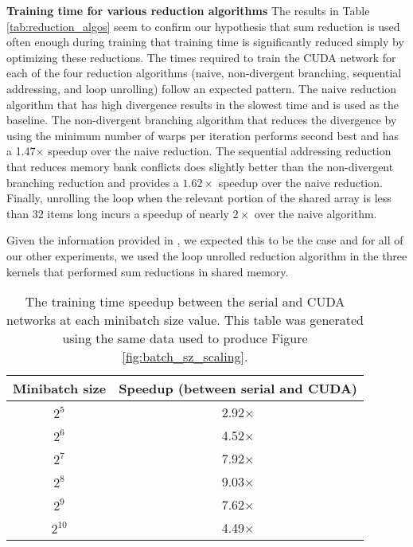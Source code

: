 \documentclass[11pt,a4paper]{article}
\begin{document}
\vspace{10pt}
\noindent \textbf{Training time for various reduction algorithms}
The results in Table \ref{tab:reduction_algos} seem to confirm our hypothesis that sum reduction is used often enough during training that training time is significantly reduced simply by optimizing these reductions. The times required to train the CUDA network for each of the four reduction algorithms (naive, non-divergent branching, sequential addressing, and loop unrolling) follow an expected pattern. The naive reduction algorithm that has high divergence results in the slowest time and is used as the baseline. The non-divergent branching algorithm that reduces the divergence by using the minimum number of warps per iteration performs second best and has a 1.47$\times$ speedup over the naive reduction. The sequential addressing reduction that reduces memory bank conflicts does slightly better than the non-divergent branching reduction and provides a $1.62\times$ speedup over the naive reduction. Finally, unrolling the loop when the relevant portion of the shared array is less than 32 items long incurs a speedup of nearly $2\times$ over the naive algorithm. 

Given the information provided in \cite{choi_reductions}, we expected this to be the case and for all of our other experiments, we used the loop unrolled reduction algorithm in the three kernels that performed sum reductions in shared memory.

\vspace{10pt}
\noindent 
\begin{table} 
\centering
\small
  \begin{tabular}{|c||c|}
    \hline
    Minibatch size & Speedup (between serial and CUDA)\\
    \hline
    \rule{0pt}{2.5ex}$2^5$ & 2.92$\times$\\ 
    \hline
    \rule{0pt}{2.5ex}$2^6$ & 4.52$\times$\\ 
    \hline
    \rule{0pt}{2.5ex}$2^7$ & 7.92$\times$\\ 
    \hline
    \rule{0pt}{2.5ex}$2^8$ & 9.03$\times$\\ 
    \hline
    \rule{0pt}{2.5ex}$2^9$ & 7.62$\times$\\ 
    \hline
    \rule{0pt}{2.5ex}$2^{10}$ & 4.49$\times$\\ 
    \hline
  \end{tabular} \caption{The training time speedup between the serial and CUDA networks at each minibatch size value. This table was generated using the same data used to produce Figure \ref{fig:batch_sz_scaling}.} \label{tab:batch_sz_scaling}
\end{table}
\end{document}

